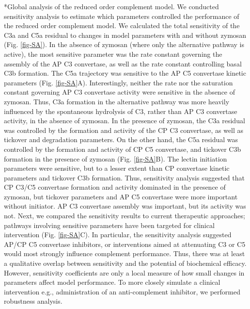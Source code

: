 \documentclass[12pt]{article}
\makeatletter
\renewcommand\subsection{\@startsection
	{subsection}{2}{0mm}
	{-0.05in}
	{-0.5\baselineskip}
	{\normalfont\normalsize\bfseries}}
\makeatother
\begin{document}
\subsection*{Global analysis of the reduced order complement model.}
We conducted sensitivity analysis to estimate which parameters controlled the performance of the reduced order complement model.
We calculated the total sensitivity of the C3a and C5a residual to changes in model parameters with and without zymosan (Fig. \ref{fig-SA}).
In the absence of zymosan (where only the alternative pathway is active), the most sensitive parameter was the rate constant governing the assembly of the AP C3 convertase, as
well as the rate constant controlling basal C3b formation. The C5a trajectory was sensitive to the AP C5 convertase kinetic parameters (Fig. \ref{fig-SA}A).
Interestingly, neither the rate nor the saturation constant governing AP C3 convertase activity were sensitive in the absence of zymosan.
Thus, C3a formation in the alternative pathway was more heavily influenced by the spontaneous hydrolysis of C3, rather than AP C3 convertase activity, in the absence of zymosan.
In the presence of zymosan, the C3a residual was controlled by the formation and activity of the CP C3 convertase, as well as tickover and degradation parameters.
On the other hand, the C5a residual was controlled by the formation and activity of CP C5 convertase, and tickover C3b formation in the presence of zymosan (Fig. \ref{fig-SA}B).
The lectin initiation parameters were sensitive, but to a lesser extent than CP convertase kinetic parameters and tickover C3b formation.
Thus, sensitivity analysis suggested that CP C3/C5 convertase formation and activity dominated in the presence of zymosan, but tickover parameters and AP C5 convertase were more important
without initiator. AP C3 convertase assembly was important, but its activity was not.
Next, we compared the sensitivity results to current therapeutic approaches;
pathways involving sensitive parameters have been targeted for clinical intervention (Fig. \ref{fig-SA}C).
In particular, the sensitivity analysis suggested AP/CP C5 convertase inhibitors, or interventions aimed at attenuating C3 or C5 would most strongly influence complement performance.
Thus, there was at least a qualitative overlap between sensitivity and the potential of biochemical efficacy.
However, sensitivity coefficients are only a local measure of how small changes in parameters affect model performance.
To more closely simulate a clinical intervention e.g., administration of an anti-complement inhibitor, we performed
robustness analysis.
\end{document}
